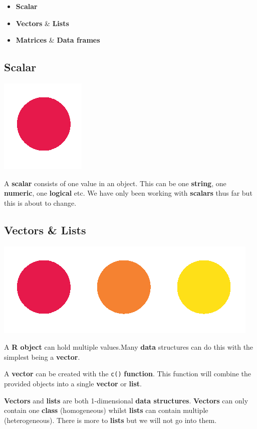 \documentclass[]{book}
\providecommand{\tightlist}{%
  \setlength{\itemsep}{0pt}\setlength{\parskip}{0pt}}
\begin{document}
\begin{itemize}
\tightlist
\item
  \textbf{Scalar}
\item
  \textbf{Vectors} \& \textbf{Lists}
\item
  \textbf{Matrices} \& \textbf{Data frames}
\end{itemize}

\subsection{Scalar}\label{scalar}

\begin{center}\includegraphics[width=0.2\linewidth]{figures/Rscalar} \end{center}

A \textbf{scalar} consists of one value in an object. This can be one
\textbf{string}, one \textbf{numeric}, one \textbf{logical} etc. We have
only been working with \textbf{scalars} thus far but this is about to
change.

\subsection{Vectors \& Lists}\label{vectors-lists}

\begin{center}\includegraphics[width=0.2\linewidth]{figures/Rvector} \end{center}

A \textbf{R object} can hold multiple values.Many \textbf{data}
structures can do this with the simplest being a \textbf{vector}.

A \textbf{vector} can be created with the \texttt{c()}
\textbf{function}. This function will combine the provided objects into
a single \textbf{vector} or \textbf{list}.

\textbf{Vectors} and \textbf{lists} are both 1-dimensional \textbf{data
structures}. \textbf{Vectors} can only contain one \textbf{class}
(homogeneous) whilst \textbf{lists} can contain multiple
(heterogeneous). There is more to \textbf{lists} but we will not go into
them.
\end{document}
